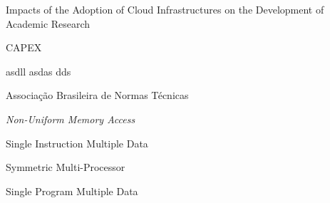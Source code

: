 \documentclass[tese,capa]{texufpel}
\begin{document}
\begin{englishabstract}{Impacts of the Adoption of Cloud Infrastructures on the Development of Academic Research}
\end{englishabstract}

\listoffigures

\listoftables



\begin{listofabbrv}{CAPEX}%
        \item[CAPEX] asdll asdas dds
        \item[\textbf{ABNT}] Associação Brasileira de Normas Técnicas
        \item[NUMA] \textit{Non-Uniform Memory Access}
        \item[SIMD] Single Instruction Multiple Data
        \item[SMP] Symmetric Multi-Processor
        \item[SPMD] Single Program Multiple Data
\end{listofabbrv}


\listoftodos %
\end{document}
